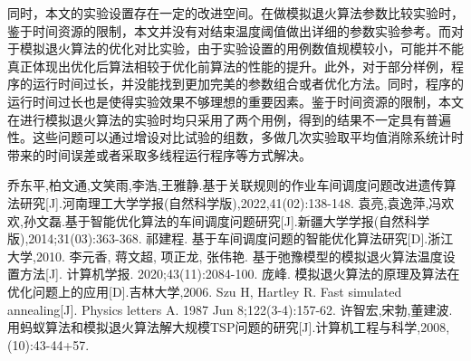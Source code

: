 \documentclass[UTF8]{ctexart}
\begin{document}
同时，本文的实验设置存在一定的改进空间。在做模拟退火算法参数比较实验时，鉴于时间资源的限制，本文并没有对结束温度阈值做出详细的参数实验参考。而对于模拟退火算法的优化对比实验，由于实验设置的用例数值规模较小，可能并不能真正体现出优化后算法相较于优化前算法的性能的提升。此外，对于部分样例，程序的运行时间过长，并没能找到更加完美的参数组合或者优化方法。同时，程序的运行时间过长也是使得实验效果不够理想的重要因素。鉴于时间资源的限制，本文在进行模拟退火算法的实验时均只采用了两个用例，得到的结果不一定具有普遍性。这些问题可以通过增设对比试验的组数，多做几次实验取平均值消除系统计时带来的时间误差或者采取多线程运行程序等方式解决。


\begin{thebibliography}{99}  
	
	乔东平,柏文通,文笑雨,李浩,王雅静.基于关联规则的作业车间调度问题改进遗传算法研究{[}J{]}.河南理工大学学报(自然科学版),2022,41(02):138-148.
	袁亮,袁逸萍,冯欢欢,孙文磊.基于智能优化算法的车间调度问题研究{[}J{]}.新疆大学学报(自然科学版),2014;31(03):363-368. 
	祁建程. 基于车间调度问题的智能优化算法研究{[}D{]}.浙江大学,2010.
	李元香, 蒋文超, 项正龙, 张伟艳.
	基于弛豫模型的模拟退火算法温度设置方法{[}J{]}. 计算机学报.
	2020;43(11):2084-100.
	庞峰.
	模拟退火算法的原理及算法在优化问题上的应用{[}D{]}.吉林大学,2006.
	Szu H, Hartley R. Fast simulated annealing{[}J{]}. Physics
	letters A. 1987 Jun 8;122(3-4):157-62.
	许智宏,宋勃,董建波.用蚂蚁算法和模拟退火算法解大规模TSP问题的研究[J].计算机工程与科学,2008,(10):43-44+57.
\end{thebibliography}
\end{document}
